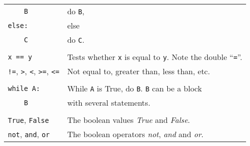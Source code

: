 \begin{tabular}{p{6cm}p{7.2cm}}
\verb!    B!    & \quad do \texttt{B},\\
\verb!else:!    & else\\
\verb!    C!    & \quad do \texttt{C}.\\
\\
\texttt{x == y}          & Tests whether \texttt{x} is equal to
\texttt{y}.  Note the double ``\texttt{=}''.\\
\verb+!=+, \verb+>+, \verb+<+, \verb+>=+, \verb+<=+ 
                  & Not equal to, greater than, less than, etc.\\
\\
\verb!while A:! & While \texttt{A} is True, do \texttt{B}. \texttt{B} can be a block\\
\verb!    B!   &     with several statements.\\
\\
\verb!True!, \verb!False! & The boolean values \emph{True} and \emph{False}.\\
\verb+not+, \verb+and+, \verb+or+  & The boolean operators \emph{not}, \emph{and} and \emph{or}.
\end{tabular}
\vspace*{5pt}



